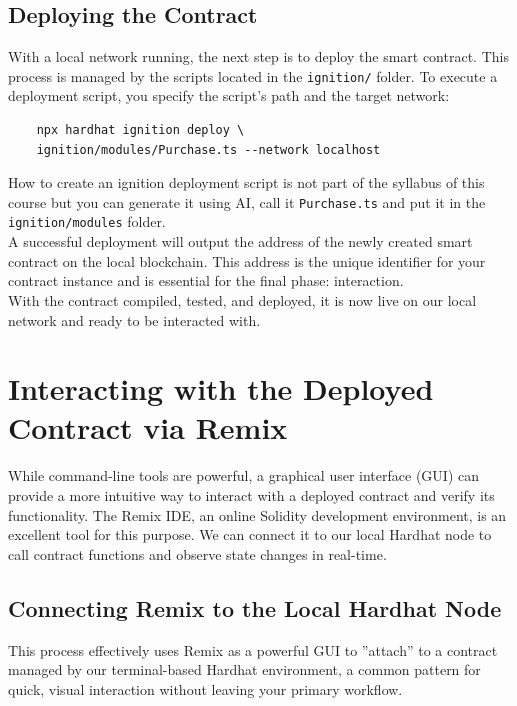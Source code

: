 \documentclass{scrbook}
\begin{document}
\section{Deploying the Contract}

With a local network running, the next step is to deploy the smart contract. This process is managed by the scripts located in the \texttt{ignition/} folder. To execute a deployment script, you specify the script's path and the target network:

\begin{lstlisting}
    npx hardhat ignition deploy \
    ignition/modules/Purchase.ts --network localhost
\end{lstlisting}

How to create an ignition deployment script is not part of the syllabus of this course but you can generate it using AI, call it \texttt{Purchase.ts} and put it in the \texttt{ignition/modules} folder.\\

A successful deployment will output the address of the newly created smart contract on the local blockchain. This address is the unique identifier for your contract instance and is essential for the final phase: interaction.\\

With the contract compiled, tested, and deployed, it is now live on our local network and ready to be interacted with.

\chapter{Interacting with the Deployed Contract via Remix}

While command-line tools are powerful, a graphical user interface (GUI) can provide a more intuitive way to interact with a deployed contract and verify its functionality. The Remix IDE, an online Solidity development environment, is an excellent tool for this purpose. We can connect it to our local Hardhat node to call contract functions and observe state changes in real-time.

\section{Connecting Remix to the Local Hardhat Node}

This process effectively uses Remix as a powerful GUI to ''attach'' to a contract managed by our terminal-based Hardhat environment, a common pattern for quick, visual interaction without leaving your primary workflow.\\
\end{document}
